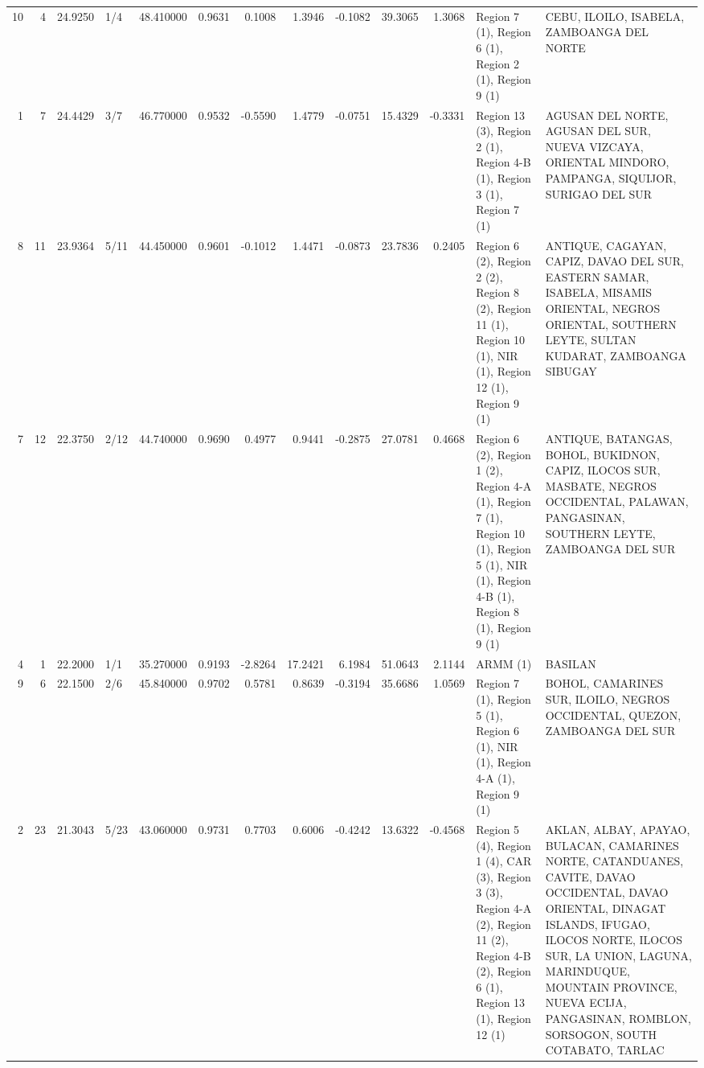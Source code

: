 \begin{tabular}{rrrlrrrrrrrll}
10 & 4 & {\cellcolor[HTML]{A6C4FE}} \color[HTML]{000000} 24.9250 & 1/4 & {\cellcolor[HTML]{DA5A49}} \color[HTML]{F1F1F1} 48.410000 & 0.9631 & 0.1008 & 1.3946 & -0.1082 & 39.3065 & 1.3068 & Region 7 (1), Region 6 (1), Region 2 (1), Region 9 (1) & CEBU, ILOILO, ISABELA, ZAMBOANGA DEL NORTE \\
1 & 7 & {\cellcolor[HTML]{A3C2FE}} \color[HTML]{000000} 24.4429 & 3/7 & {\cellcolor[HTML]{EC8165}} \color[HTML]{F1F1F1} 46.770000 & 0.9532 & -0.5590 & 1.4779 & -0.0751 & 15.4329 & -0.3331 & Region 13 (3), Region 2 (1), Region 4-B (1), Region 3 (1), Region 7 (1) & AGUSAN DEL NORTE, AGUSAN DEL SUR, NUEVA VIZCAYA, ORIENTAL MINDORO, PAMPANGA, SIQUIJOR, SURIGAO DEL SUR \\
8 & 11 & {\cellcolor[HTML]{9FBFFF}} \color[HTML]{000000} 23.9364 & 5/11 & {\cellcolor[HTML]{F7AF91}} \color[HTML]{000000} 44.450000 & 0.9601 & -0.1012 & 1.4471 & -0.0873 & 23.7836 & 0.2405 & Region 6 (2), Region 2 (2), Region 8 (2), Region 11 (1), Region 10 (1), NIR (1), Region 12 (1), Region 9 (1) & ANTIQUE, CAGAYAN, CAPIZ, DAVAO DEL SUR, EASTERN SAMAR, ISABELA, MISAMIS ORIENTAL, NEGROS ORIENTAL, SOUTHERN LEYTE, SULTAN KUDARAT, ZAMBOANGA SIBUGAY \\
7 & 12 & {\cellcolor[HTML]{96B7FF}} \color[HTML]{000000} 22.3750 & 2/12 & {\cellcolor[HTML]{F7A98B}} \color[HTML]{000000} 44.740000 & 0.9690 & 0.4977 & 0.9441 & -0.2875 & 27.0781 & 0.4668 & Region 6 (2), Region 1 (2), Region 4-A (1), Region 7 (1), Region 10 (1), Region 5 (1), NIR (1), Region 4-B (1), Region 8 (1), Region 9 (1) & ANTIQUE, BATANGAS, BOHOL, BUKIDNON, CAPIZ, ILOCOS SUR, MASBATE, NEGROS OCCIDENTAL, PALAWAN, PANGASINAN, SOUTHERN LEYTE, ZAMBOANGA DEL SUR \\
4 & 1 & {\cellcolor[HTML]{94B6FF}} \color[HTML]{000000} 22.2000 & 1/1 & {\cellcolor[HTML]{8DB0FE}} \color[HTML]{000000} 35.270000 & 0.9193 & -2.8264 & 17.2421 & 6.1984 & 51.0643 & 2.1144 & ARMM (1) & BASILAN \\
9 & 6 & {\cellcolor[HTML]{94B6FF}} \color[HTML]{000000} 22.1500 & 2/6 & {\cellcolor[HTML]{F39577}} \color[HTML]{000000} 45.840000 & 0.9702 & 0.5781 & 0.8639 & -0.3194 & 35.6686 & 1.0569 & Region 7 (1), Region 5 (1), Region 6 (1), NIR (1), Region 4-A (1), Region 9 (1) & BOHOL, CAMARINES SUR, ILOILO, NEGROS OCCIDENTAL, QUEZON, ZAMBOANGA DEL SUR \\
2 & 23 & {\cellcolor[HTML]{8FB1FE}} \color[HTML]{000000} 21.3043 & 5/23 & {\cellcolor[HTML]{F5C4AC}} \color[HTML]{000000} 43.060000 & 0.9731 & 0.7703 & 0.6006 & -0.4242 & 13.6322 & -0.4568 & Region 5 (4), Region 1 (4), CAR (3), Region 3 (3), Region 4-A (2), Region 11 (2), Region 4-B (2), Region 6 (1), Region 13 (1), Region 12 (1) & AKLAN, ALBAY, APAYAO, BULACAN, CAMARINES NORTE, CATANDUANES, CAVITE, DAVAO OCCIDENTAL, DAVAO ORIENTAL, DINAGAT ISLANDS, IFUGAO, ILOCOS NORTE, ILOCOS SUR, LA UNION, LAGUNA, MARINDUQUE, MOUNTAIN PROVINCE, NUEVA ECIJA, PANGASINAN, ROMBLON, SORSOGON, SOUTH COTABATO, TARLAC \\

\end{tabular}
